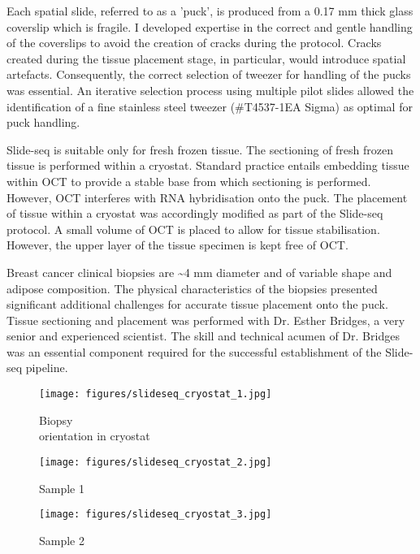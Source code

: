 Each spatial slide, referred to as a 'puck', is produced from a 0.17 mm thick glass coverslip which is fragile. I developed expertise in the correct and gentle handling of the coverslips to avoid the creation of cracks during the protocol. Cracks created during the tissue placement stage, in particular, would introduce spatial artefacts. Consequently, the correct selection of tweezer for handling of the pucks was essential. An iterative selection process using multiple pilot slides allowed the identification of a fine stainless steel tweezer (\#T4537-1EA Sigma) as optimal for puck handling.

Slide-seq is suitable only for fresh frozen tissue. The sectioning of fresh frozen tissue is performed within a cryostat. Standard practice entails embedding tissue within OCT to provide a stable base from which sectioning is performed. However, OCT interferes with RNA hybridisation onto the puck. The placement of tissue within a cryostat was accordingly modified as part of the Slide-seq protocol. A small volume of OCT is placed to allow for tissue stabilisation. However, the upper layer of the tissue specimen is kept free of OCT. 

Breast cancer clinical biopsies are \textasciitilde 4 mm diameter and of variable shape and adipose composition. The physical characteristics of the biopsies presented significant additional challenges for accurate tissue placement onto the puck. Tissue sectioning and placement was performed with Dr. Esther Bridges, a very senior and experienced scientist. The skill and technical acumen of Dr. Bridges was an essential component required for the successful establishment of the Slide-seq pipeline.


\begin{figure}[!htb]
		\left
		\texttt{[image: figures/slideseq\_cryostat\_1.jpg]} \hfill
		\caption[Biopsy orientation in cryostat]{Biopsy \\ orientation in cryostat}
		\label{fig:slideseq_cryostat_1}
	\endminipage\hfill
		\centering
		\texttt{[image: figures/slideseq\_cryostat\_2.jpg]} \hfill
		\caption[Sample 1]{Sample 1}
		\label{fig:slideseq_cryostat_2}
	\endminipage\hfill
		\centering
		\texttt{[image: figures/slideseq\_cryostat\_3.jpg]} \hfill
		\caption[Sample 2]{Sample 2}
		\label{fig:slideseq_cryostat_3}
	\endminipage
\end{figure}




